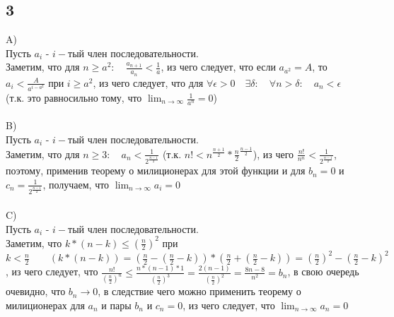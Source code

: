 		
		\subsection{3}
		A)\\
		Пусть $a_i$ - $i-\text{тый}$ член последовательности.\\ 
		Заметим, что для $n \geq a^2: \quad \frac{a_{n+1}}{a_{n} } < \frac{1}{a}$, из чего следует, что если $a_{a^2} = A$, то $a_i < \frac{A}{a^{i-a^2} }$ при $i \geq a^2$, из чего следует, что для $\forall \epsilon > 0 \quad \exists \delta : \quad \forall n > \delta : \quad a_n < \epsilon $ (т.к. это равносильно тому, что $\lim_{n \to \infty} \frac{1}{a^n} = 0$)
		\\ \\
		B)\\
		Пусть $a_i$ - $i-\text{тый}$ член последовательности.\\
		Заметим, что для $n \geq 3: \quad a_n < \frac{1}{2^{\frac{n-1}{2} } }$ (т.к. $n! < n^{\frac{n+1}{2}} * {\frac{n}{2}}^{\frac{n-1}{2}}$), из чего $\frac{n!}{n^n} < \frac{1}{2^{\frac{n-1}{2}}}$, поэтому, применив теорему о милиционерах для этой функции и для $b_n = 0$ и $c_n = \frac{1}{2^\frac{n-1}{2}}$, получаем, что $\lim_{n \to \infty} a_i = 0$
		\\ \\					
		C)\\
		Пусть $a_i$ - $i-\text{тый}$ член последовательности.\\ 
		Заметим, что $k*(n-k) \leq (\frac{n}{2})^2$ при $k < \frac{n}{2} \qquad (k*(n-k)) = (\frac{n}{2} - (\frac{n}{2} - k)) * (\frac{n}{2} + (\frac{n}{2} - k)) = (\frac{n}{2})^2 - (\frac{n}{2} - k)^2$, из чего следует, что $\frac{n!}{(\frac{n}{2})^n} \leq \frac{n*(n-1)*1}{(\frac{n}{2})^3} = \frac{2(n-1)}{(\frac{n}{2})^2} = \frac{8n-8}{n^2} = b_n$, в свою очередь очевидно, что $b_n \to 0$, в следствие чего можно применить теорему о милиционерах для $a_n$ и пары $b_n$ и $c_n = 0$, из чего следует, что $\lim_{n \to \infty} a_n = 0$
		
